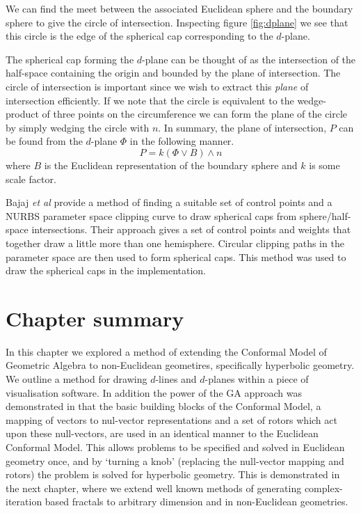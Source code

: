 We can find the meet between the associated Euclidean sphere and the
boundary sphere to give the circle of intersection. Inspecting figure
\ref{fig:dplane} we
see that this circle is the edge of the spherical
cap corresponding to the $d$-plane.

The spherical cap forming the $d$-plane can be thought of as the
intersection of the half-space containing the origin and bounded
by the plane of intersection.
The circle of intersection is important since we wish to extract
this \emph{plane} of intersection efficiently. 
If we note that the circle is equivalent to the wedge-product of three
points on the circumference we can form the plane of the circle
by simply wedging the circle with $n$. In summary,
the plane of intersection, $P$ can be found from the $d$-plane $\Phi$ in
the following manner.
\[
P = k (\Phi \vee B) \wedge n
\]
where $B$ is the Euclidean representation of the boundary sphere
and $k$ is some scale factor.


Bajaj \emph{et al}\cite{spherecap} provide a method of finding
a suitable set of control points and a NURBS parameter space clipping
curve to draw spherical caps from sphere/half-space intersections.
Their approach gives a set of control points and weights that together
draw a little more than one hemisphere. Circular clipping paths in the 
parameter space are then used to form spherical caps.
This method was used to draw the spherical caps in the implementation.


\section{Chapter summary}

In this chapter we explored a method of extending the Conformal Model
of Geometric Algebra to non-Euclidean geometires, specifically hyperbolic geometry. We
outline a method for drawing $d$-lines and $d$-planes within a piece of
visualisation software. In addition the power of the GA approach was demonstrated
in that the basic building blocks of the Conformal Model, a mapping of vectors
to nul-vector representations and a set of rotors which act upon these
null-vectors, are used in an identical manner to the Euclidean Conformal Model.
This allows problems to be specified and solved in Euclidean geometry 
once, and by `turning a knob' (replacing the null-vector mapping and rotors) the
problem is solved for hyperbolic geometry. This is demonstrated in the next
chapter, where we extend well known methods of generating complex-iteration
based fractals to arbitrary dimension and in non-Euclidean geometries.
